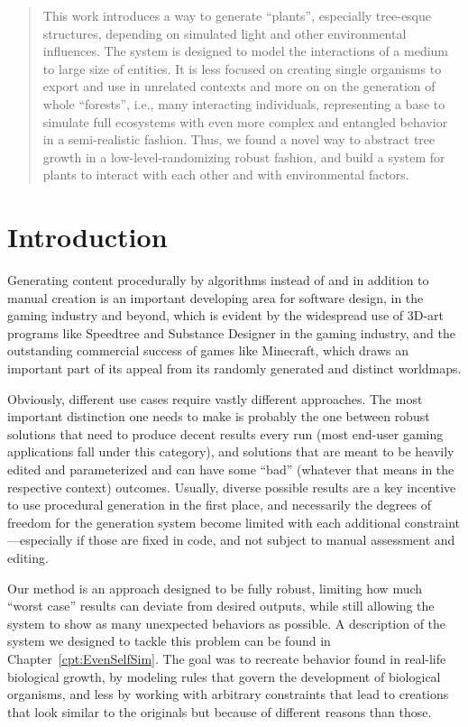 \documentclass[11pt, abstract=on]{scrartcl}
\begin{document}
\begin{abstract}

This work introduces a way to generate ``plants'', especially tree-esque structures, depending on simulated light and other environmental influences. The system is designed to model the interactions of a medium to large size of entities. It is less focused on creating single organisms to export and use in unrelated contexts and more on on the generation of whole ``forests'', i.e., many interacting individuals, representing a base to simulate full ecosystems with even more complex and entangled behavior in a semi-realistic fashion. Thus, we found a novel way to abstract tree growth in a low-level-randomizing robust fashion, and build a system for plants to interact with each other and with environmental factors.
\end{abstract}

\section{Introduction}
Generating content procedurally by algorithms instead of and in addition to manual creation is an important developing area for software design, in the gaming industry and beyond, which is evident by the widespread use of 3D-art programs like Speedtree and Substance Designer in the gaming industry, and the outstanding commercial success of games like Minecraft, which draws an important part of its appeal from its randomly generated and distinct worldmaps.

Obviously, different use cases require vastly different approaches. The most important distinction one needs to make is probably the one between robust solutions that need to produce decent results every run (most end-user gaming applications fall under this category), and solutions that are meant to be heavily edited and parameterized and can have some ``bad'' (whatever that means in the respective context) outcomes. Usually, diverse possible results are a key incentive to use procedural generation in the first place, and necessarily the degrees of freedom for the generation system become limited with each additional constraint---especially if those are fixed in code, and not subject to manual assessment and editing.

Our method is an approach designed to be fully robust, limiting how much ``worst case'' results can deviate from desired outputs, while still allowing the system to show as many unexpected behaviors as possible. A description of the system we designed to tackle this problem can be found in Chapter~\ref{cpt:EvenSelfSim}. The goal was to recreate behavior found in real-life biological growth, by modeling rules that govern the development of biological organisms, and less by working with arbitrary constraints that lead to creations that look similar to the originals but because of different reasons than those.
\end{document}
